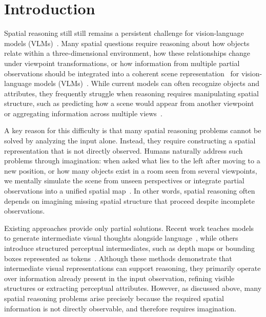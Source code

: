 \documentclass{llmxive}
\begin{document}
\section{Introduction}
\label{sec:intro}






Spatial reasoning still still remains a persistent challenge for vision-language models (VLMs)~\cite{deitke2025molmo,clark2026molmo2,bai2025qwen3vl}. Many spatial questions require reasoning about how objects relate within a three-dimensional environment, how these relationships change under viewpoint transformations, or how information from multiple partial observations should be integrated into a coherent scene representation~\cite{yin2025mindcube, kamath2023whatsup} for vision-language models (VLMs)~\cite{deitke2025molmo,clark2026molmo2,bai2025qwen3vl}. While current models can often recognize objects and attributes, they frequently struggle when reasoning requires manipulating spatial structure, such as predicting how a scene would appear from another viewpoint~\cite{li2025viewspatialbench, ma20253dsrbench} or aggregating information across multiple views~\cite{yang2025mmsibench}.

A key reason for this difficulty is that many spatial reasoning problems cannot be solved by analyzing the input alone. Instead, they require constructing a spatial representation that is not directly observed. Humans naturally address such problems through imagination: when asked what lies to the left after moving to a new position, or how many objects exist in a room seen from several viewpoints, we mentally simulate the scene from unseen perspectives or integrate partial observations into a unified spatial map~\cite{yang2025thinkinginspace,yin2025mindcube,zhang2026theoryofspace}. In other words, spatial reasoning often depends on imagining missing spatial structure that proceed despite incomplete observations.

Existing approaches provide only partial solutions. Recent work teaches models to generate intermediate visual thoughts alongside language~\cite{gu2025thinkmorph, li2025mvot, hu2024visualsketchpad}, while others introduce structured perceptual intermediates, such as depth maps or bounding boxes represented as tokens~\cite{bigverdi2024aurora, yang2025mirage, ray2025mulltokens}. Although these methods demonstrate that intermediate visual representations can support reasoning, they primarily operate over information already present in the input observation, refining visible structures or extracting perceptual attributes. However, as discussed above, many spatial reasoning problems arise precisely because the required spatial information is not directly observable, and therefore requires imagination.
\end{document}
